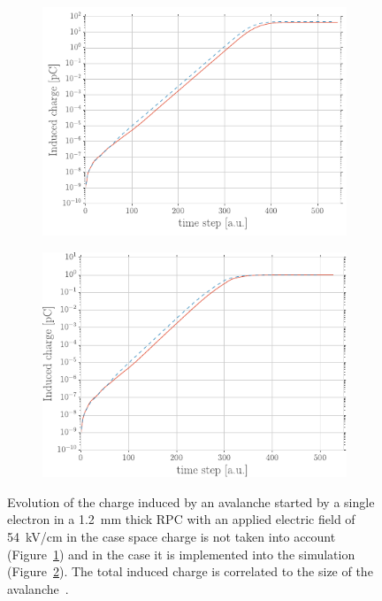 	\begin{figure}[H]
		\begin{subfigure}{0.5\linewidth}
			\centering
			\includegraphics[width = 0.55\plotwidth]{fig/chapt4/Induced_charge_no_space_charge.pdf}
			\caption{\label{fig:Space-charge-effect:A}}
		\end{subfigure}
		\begin{subfigure}{0.5\linewidth}
			\centering
			\includegraphics[width = 0.55\plotwidth]{fig/chapt4/Induced_charge_w_space_charge.pdf}
			\caption{\label{fig:Space-charge-effect:B}}
		\end{subfigure}
		\caption{\label{fig:Space-charge-effect} Evolution of the charge induced by an avalanche started by a single electron in a \SI{1.2}{mm} thick RPC with an applied electric field of \SI{54}{kV/cm} in the case space charge is not taken into account (Figure~\ref{fig:Space-charge-effect:A}) and in the case it is implemented into the simulation (Figure~\ref{fig:Space-charge-effect:B}). The total induced charge is correlated to the size of the avalanche~\cite{VINCENT2017}.}
	\end{figure}
	
